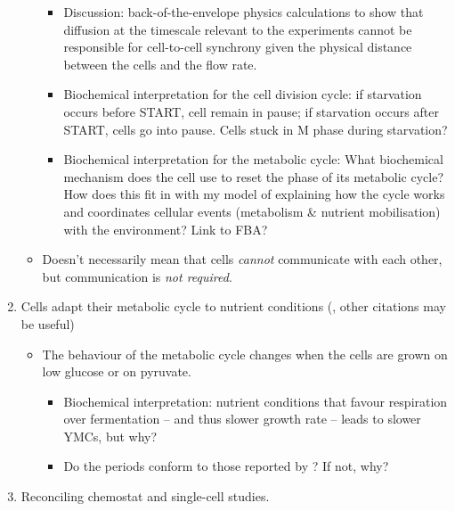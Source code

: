 \begin{enumerate}
\begin{itemize}
\begin{itemize}
\item Discussion: back-of-the-envelope physics calculations to show that diffusion at the timescale relevant to the experiments cannot be responsible for cell-to-cell synchrony given the physical distance between the cells and the flow rate.
\item Biochemical interpretation for the cell division cycle: if starvation occurs before START, cell remain in pause; if starvation occurs after START, cells go into pause.  Cells stuck in M phase during starvation?
\item Biochemical interpretation for the metabolic cycle: What biochemical mechanism does the cell use to reset the phase of its metabolic cycle?  How does this fit in with my model of explaining how the cycle works and coordinates cellular events (metabolism \& nutrient mobilisation) with the environment?  Link to FBA?
\end{itemize}
\item Doesn't necessarily mean that cells \emph{cannot} communicate with each other, but communication is \emph{not required}.
\end{itemize}
\item Cells adapt their metabolic cycle to nutrient conditions (\cite{papagiannakisAutonomousMetabolicOscillations2017}, other citations may be useful)
\begin{itemize}
\item The behaviour of the metabolic cycle changes when the cells are grown on low glucose or on pyruvate.
\begin{itemize}
\item Biochemical interpretation: nutrient conditions that favour respiration over fermentation -- and thus slower growth rate -- leads to slower YMCs, but why?
\item Do the periods conform to those reported by \cite{papagiannakisAutonomousMetabolicOscillations2017}?  If not, why?
\end{itemize}
\end{itemize}
\item Reconciling chemostat and single-cell studies.


\end{enumerate}
